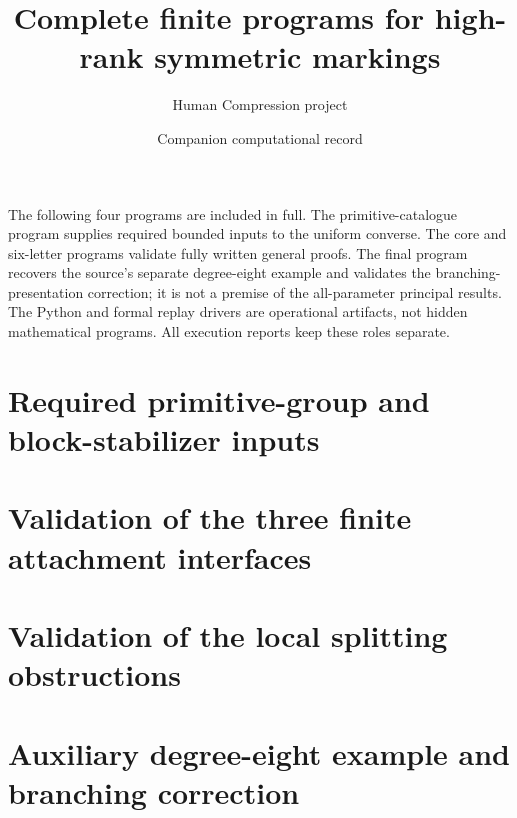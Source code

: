 
\title{Complete finite programs for high-rank symmetric markings}
\author{Human Compression project}
\date{Companion computational record}
\maketitle
The following four programs are included in full. The primitive-catalogue
program supplies required bounded inputs to the uniform converse.
The core and six-letter programs validate fully written general proofs.
The final program recovers the source's separate degree-eight example
and validates the branching-presentation correction; it is not a
premise of the all-parameter principal results. The Python and formal
replay drivers are operational artifacts, not hidden mathematical
programs. All execution reports keep these roles separate.

\section{Required primitive-group and block-stabilizer inputs}
\section{Validation of the three finite attachment interfaces}
\section{Validation of the local splitting obstructions}
\section{Auxiliary degree-eight example and branching correction}


